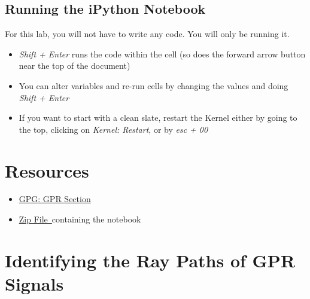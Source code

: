 \documentclass[twosides]{EOSC350Lab} %
\newcommand{\ZipFile}{\href{https://www.dropbox.com/s/trn3huvlvb8nd3c/notebook.zip?dl=0}{Zip File~}}
\newcommand{\GPRMovie}{\href{http://www.eos.ubc.ca/courses/eosc350/content/2014/labs/Lab6/raypaths.html}{GPR Movie~}}
\newcommand{\GPGGPR}{\href{http://gpg.geosci.xyz/en/latest/content/GPR/index.html}{GPG: GPR Section}}
\begin{document}
\begin{framed}
\subsection*{Running the iPython Notebook}
	For this lab, you will not have to write any code. You will only be running it.
	\begin{itemize}
		\item \emph{Shift + Enter} runs the code within the cell (so does the forward arrow button near the top of the document)
		\item You can alter variables and re-run cells by changing the values and doing \emph{Shift + Enter}
		\item If you want to start with a clean slate, restart the Kernel either by going to the top, clicking on \emph{Kernel: Restart}, or by \emph{esc + 00}
	\end{itemize}


\section*{Resources}
\begin{itemize}
 	\item \GPGGPR 
	\item \ZipFile containing the notebook
\end{itemize}

\end{framed}



\pagebreak







\section*{Identifying the Ray Paths of GPR Signals}  %
%
\end{document}
